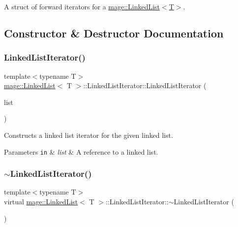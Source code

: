 A struct of forward iterators for a \hyperlink{classmage_1_1_linked_list}{mage\+::\+Linked\+List$<$\+T$>$}. 

\subsection{Constructor \& Destructor Documentation}
\hypertarget{structmage_1_1_linked_list_1_1_linked_list_iterator_a5353da2850d87cebb02f04833061c7a0}{}\label{structmage_1_1_linked_list_1_1_linked_list_iterator_a5353da2850d87cebb02f04833061c7a0} 
\subsubsection{\texorpdfstring{Linked\+List\+Iterator()}{LinkedListIterator()}}
{\footnotesize\ttfamily template$<$typename T$>$ \\
\hyperlink{classmage_1_1_linked_list}{mage\+::\+Linked\+List}$<$ T $>$\+::Linked\+List\+Iterator\+::\+Linked\+List\+Iterator (\begin{DoxyParamCaption}\item[{const \hyperlink{classmage_1_1_linked_list}{Linked\+List}$<$ T $>$ \&}]{list }\end{DoxyParamCaption})}

Constructs a linked list iterator for the given linked list.


\begin{DoxyParams}[1]{Parameters}
\mbox{\tt in}  & {\em list} & A reference to a linked list. \\
\hline
\end{DoxyParams}
\hypertarget{structmage_1_1_linked_list_1_1_linked_list_iterator_a16631a6dc7aaaad10ba676f569da62b9}{}\label{structmage_1_1_linked_list_1_1_linked_list_iterator_a16631a6dc7aaaad10ba676f569da62b9} 
\subsubsection{\texorpdfstring{$\sim$\+Linked\+List\+Iterator()}{~LinkedListIterator()}}
{\footnotesize\ttfamily template$<$typename T$>$ \\
virtual \hyperlink{classmage_1_1_linked_list}{mage\+::\+Linked\+List}$<$ T $>$\+::Linked\+List\+Iterator\+::$\sim$\+Linked\+List\+Iterator (\begin{DoxyParamCaption}{ }\end{DoxyParamCaption})\hspace{0.3cm}{\ttfamily [virtual]}}

